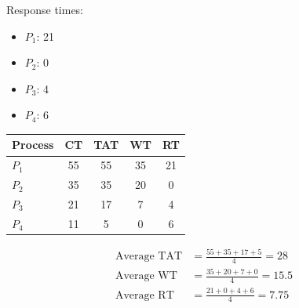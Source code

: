 \documentclass[a4paper, 10pt]{article}
\begin{document}
\begin{examplebox}{}{}
\begin{minipage}[t]{0.48\textwidth}
        Response times:
        \begin{itemize}
            \item $P_1$: 21
            \item $P_2$: 0
            \item $P_3$: 4
            \item $P_4$: 6
        \end{itemize}
    \end{minipage}
    \hfill
    \begin{minipage}[t]{0.48\textwidth}
        \begin{center}
            \begin{tabular}{@{} l c c c c @{}}
                \toprule
                Process & CT & TAT & WT & RT \\
                \midrule
                $P_1$   & 55 & 55  & 35 & 21 \\
                $P_2$   & 35 & 35  & 20 & 0  \\
                $P_3$   & 21 & 17  & 7  & 4  \\
                $P_4$   & 11 & 5   & 0  & 6  \\
                \bottomrule
            \end{tabular}
        \end{center}

        \begin{align*}
            \text{Average TAT} & = \frac{55 + 35 + 17 + 5}{4} = 28  \\
            \text{Average WT}  & = \frac{35 + 20 + 7 + 0}{4} = 15.5 \\
            \text{Average RT}  & = \frac{21 + 0 + 4 + 6}{4} = 7.75
        \end{align*}
    \end{minipage}

\end{examplebox}
\end{document}
